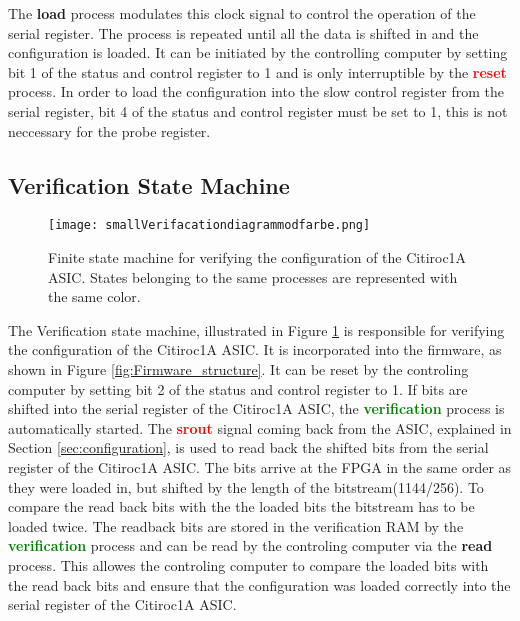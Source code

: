 The \textbf{\textcolor{VioletRed}{load}} process modulates this clock signal to control the operation of the serial register.
\newline
The process is repeated until all the data is shifted in and the configuration is loaded.
It can be initiated by the controlling computer by setting bit 1 of the status and control register to 1 and is only interruptible by the \textbf{\textcolor{red}{reset}} process.
\newline
In order to load the configuration into the slow control register from the serial register, bit 4 of the status and control register must be set to 1, this is not neccessary for the probe register.

\subsection{Verification State Machine}
\begin{figure}[H]
    \centering
    \texttt{[image: smallVerifacationdiagrammodfarbe.png]}%
    \caption{Finite state machine for verifying the configuration of the Citiroc1A ASIC.
    States belonging to the same processes are represented with the same color.}
    \label{fig:Verification_state_machine}
\end{figure}
The Verification state machine, illustrated in Figure \ref{fig:Verification_state_machine} is responsible for verifying the configuration of the Citiroc1A ASIC.
It is incorporated into the firmware, as shown in Figure \ref{fig:Firmware_structure}.
\newline
It can be reset by the controling computer by setting bit 2 of the status and control register to 1.
\newline
If bits are shifted into the serial register of the Citiroc1A ASIC, the \textbf{\textcolor{green}{verification}} process is automatically started.
The \textbf{\textcolor{red}{srout}} signal coming back from the ASIC, explained in Section \ref{sec:configuration}, is used to read back the shifted bits from the serial register of the Citiroc1A ASIC.
The bits arrive at the FPGA in the same order as they were loaded in, but shifted by the length of the bitstream(1144/256). To compare the read back bits with the the loaded bits the bitstream has to be loaded twice.
\newline
The readback bits are stored in the verification RAM by the \textbf{\textcolor{green}{verification}} process and can be read by the controling computer via the  \textbf{\textcolor{yellow!60!black}{read}} process.
This allowes the controling computer to compare the loaded bits with the read back bits and ensure that the configuration was loaded correctly into the serial register of the Citiroc1A ASIC.
